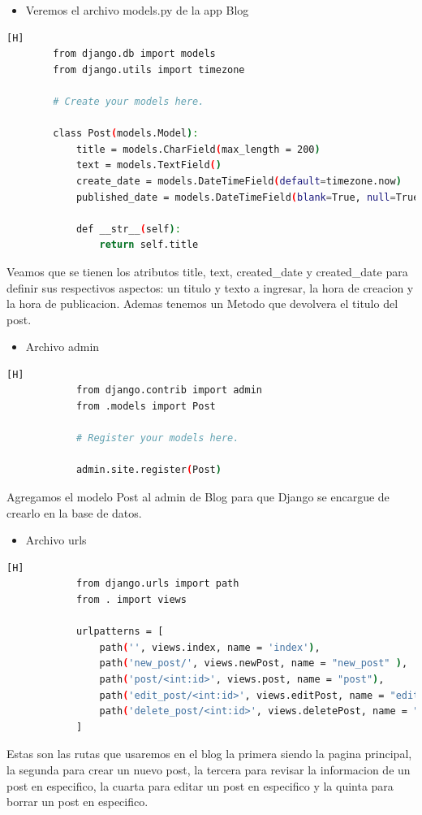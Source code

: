 \documentclass{article}
\begin{document}
        \begin{itemize}	
    		\item Veremos el archivo models.py de la app Blog
        \end{itemize}
        \begin{lstlisting}[language=bash,caption={bloque4}][H]
        from django.db import models
        from django.utils import timezone
        
        # Create your models here.
        
        class Post(models.Model):
            title = models.CharField(max_length = 200)
            text = models.TextField()
            create_date = models.DateTimeField(default=timezone.now)
            published_date = models.DateTimeField(blank=True, null=True)
        
            def __str__(self):
                return self.title
	\end{lstlisting}
    
    Veamos que se tienen los atributos title, text, created\_date  y created\_date para definir sus respectivos aspectos: un titulo y texto a ingresar, la hora de creacion y la hora de publicacion. Ademas tenemos un Metodo que devolvera el titulo del post.

        \begin{itemize}	
    		\item Archivo admin
        \end{itemize}
        
        \begin{lstlisting}[language=bash,caption={admin.py}][H]
            from django.contrib import admin
            from .models import Post
            
            # Register your models here.
            
            admin.site.register(Post)
	\end{lstlisting}
    Agregamos el modelo Post al admin de Blog para que Django se encargue de crearlo en la base de datos.   

        \begin{itemize}	
    		\item Archivo urls
        \end{itemize}
        
        \begin{lstlisting}[language=bash,caption={urls.py}][H] 
            from django.urls import path
            from . import views
            
            urlpatterns = [
                path('', views.index, name = 'index'),
                path('new_post/', views.newPost, name = "new_post" ),
                path('post/<int:id>', views.post, name = "post"),
                path('edit_post/<int:id>', views.editPost, name = "edit_post"),
                path('delete_post/<int:id>', views.deletePost, name = "delete_post")
            ]
	\end{lstlisting}
    Estas son las rutas que usaremos en el blog la primera siendo la pagina principal, la segunda para crear un nuevo post, la tercera para revisar la informacion de un post en especifico, la cuarta para editar un post en especifico y la quinta para borrar un post en especifico.
\end{document}
